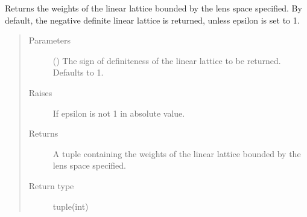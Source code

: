 \documentclass[letterpaper,10pt,english]{sphinxmanual}
\begin{document}
\begin{fulllineitems}
\begin{fulllineitems}
\begin{quote}
\begin{description}
\end{description}\end{quote}

\end{fulllineitems}


\begin{fulllineitems}
\label{\detokenize{soapy:soapy.Lens.to_linear_lattice}}
\sphinxAtStartPar
Returns the weights of the linear lattice bounded by the lens space specified. By default, the negative definite linear lattice is returned, unless epsilon is set to 1.
\begin{quote}\begin{description}
\item[{Parameters}] \leavevmode
\sphinxAtStartPar
{} (\sphinxstyleliteralemphasis{\sphinxupquote{, }}) \textendash{} The sign of definiteness of the linear lattice to be returned. Defaults to \sphinxhyphen{}1.

\item[{Raises}] \leavevmode
\sphinxAtStartPar
{} \textendash{} If epsilon is not 1 in absolute value.

\item[{Returns}] \leavevmode
\sphinxAtStartPar
A tuple containing the weights of the linear lattice bounded by the lens space specified.

\item[{Return type}] \leavevmode
\sphinxAtStartPar
tuple(int)

\end{description}\end{quote}

\end{fulllineitems}


\end{fulllineitems}

\end{document}
